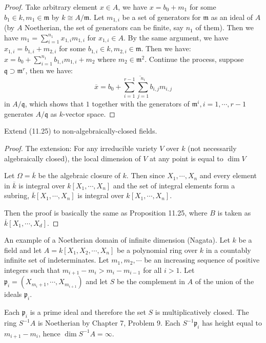 \documentclass{solution}
\begin{document}
\begin{proof}
    Take arbitrary element $x \in A$, we have $x = b_0 + m_1$ for some $b_1 \in k, m_1 \in \mathfrak{m}$ by $k \cong A / \mathfrak{m}$. Let $m_{1, i}$ be a set of generators for $\mathfrak{m}$ as an ideal of $A$ (by $A$ Noetherian, the set of generators can be finite, say $n_1$ of them). Then we have $m_1 = \sum\limits_{i = 1}^{n_1} x_{1, i} m_{1, i}$ for $x_{1, i} \in A$. By the same argument, we have $x_{1, i} = b_{1, i} + m_{2, i}$ for some $b_{1, i} \in k, m_{2, i} \in \mathfrak{m}$. Then we have: $x = b_0 + \sum\limits_{i = 1}^{n_1} b_{1, i} m_{1, i} + m_2$ where $m_2 \in \mathfrak{m}^2$. Continue the process, suppose $\mathfrak{q} \supset \mathfrak{m}^r$, then we have:
    $$\overline{x} = \overline{b_0 + \sum\limits_{i = 1}^{r - 1} \sum\limits_{j = 1}^{n_i} b_{i, j} m_{i, j}}$$
    in $A / \mathfrak{q}$, which shows that $1$ together with the generators of $\mathfrak{m}^i, i = 1, \cdots, r - 1$ generates $A / \mathfrak{q}$ as $k$-vector space.
\end{proof}

\begin{problem}
    Extend (11.25) to non-algebraically-closed fields.
\end{problem}

\begin{proof}
    The extension: For any irreducible variety $V$ over $k$ (not necessarily algebraically closed), the local dimension of $V$ at any point is equal to $\dim V$

    Let $\Omega = \overline{k}$ be the algebraic closure of $k$. Then since $X_1, \cdots, X_n$ and every element in $\overline{k}$ is integral over $k[X_1, \cdots, X_n]$ and the set of integral elements form a subring, $\overline{k}[X_1, \cdots, X_n]$ is integral over $k[X_1, \cdots, X_n]$.

    Then the proof is basically the same as Proposition 11.25, where $B$ is taken as $\overline{k}[X_1, \cdots, X_d]$.
\end{proof}

\begin{problem}
    An example of a Noetherian domain of infinite dimension (Nagata). Let $k$ be a field and let $A = k[X_1, X_2, \cdots, X_n]$ be a polynomial ring over $k$ in a countably infinite set of indeterminates. Let $m_1, m_2, \cdots$ be an increasing sequence of positive integers such that $m_{i + 1} - m_i \gt m_i - m_{i - 1}$ for all $i \gt 1$. Let $\mathfrak{p}_i = (X_{m_i + 1}, \cdots, X_{m_{i + 1}})$ and let $S$ be the complement in $A$ of the union of the ideals $\mathfrak{p}_i$.

    Each $\mathfrak{p}_i$ is a prime ideal and therefore the set $S$ is multiplicatively closed. The ring $S ^{-1}A$ is Noetherian by Chapter 7, Problem 9. Each $S ^{-1} \mathfrak{p}_i$ has height equal to $m_{i + 1} - m_i$, hence $\dim S ^{-1} A = \infty$.
\end{problem}
\end{document}

